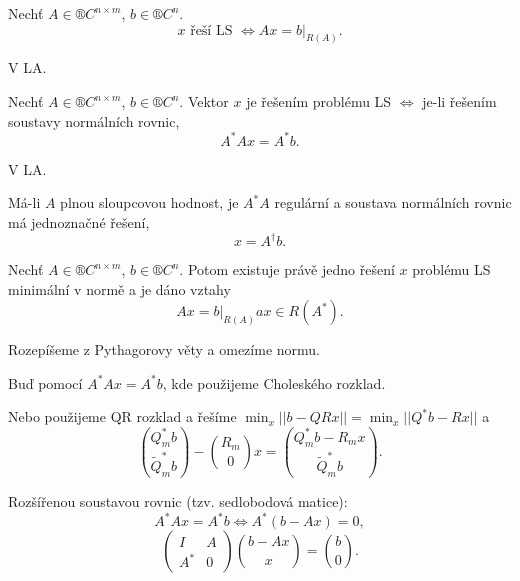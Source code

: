 \documentclass[12pt]{article}					%
\begin{document}
\begin{veta}[O řešení LS]
	Nechť $A \in ®C^{n \times m}$, $b \in ®C^n$.
	$$ x \text{ řeší LS } \Leftrightarrow Ax = b|_{R(A)}. $$

	\begin{dukazin}
		V LA.
	\end{dukazin}
\end{veta}

\begin{veta}
	Nechť $A \in ®C^{n \times m}$, $b \in ®C^n$. Vektor $x$ je řešením problému LS $\Leftrightarrow$ je-li řešením soustavy normálních rovnic,
	$$ A^*Ax = A^*b. $$

	\begin{dukazin}
		V LA.
	\end{dukazin}
\end{veta}

\begin{poznamka}
	Má-li $A$ plnou sloupcovou hodnost, je $A^*A$ regulární a soustava normálních rovnic má jednoznačné řešení,
	$$ x = A^\dagger b. $$
\end{poznamka}

\begin{veta}
	Nechť $A \in ®C^{n \times m}$, $b \in ®C^n$. Potom existuje právě jedno řešení $x$ problému LS minimální v normě a je dáno vztahy
	$$ Ax = b|_{R(A)} a x \in R(A^*). $$
	
	\begin{dukazin}
		Rozepíšeme z Pythagorovy věty a omezíme normu.
	\end{dukazin}
\end{veta}

\begin{poznamka}[Řešení LS]
	Buď pomocí $A^*Ax = A^*b$, kde použijeme Choleského rozklad.

	Nebo použijeme QR rozklad a řešíme $\min_x ||b - QRx|| = \min_x||Q^*b - Rx||$ a
	$$ \binom{Q^*_m b}{\tilde Q_m^*b} - \binom{R_m}{0}x = \binom{Q_m^* b - R_m x}{\tilde Q_m^* b}. $$

	Rozšířenou soustavou rovnic (tzv. sedlobodová matice):
	$$ A^*Ax = A^*b \Leftrightarrow A^*(b - Ax) = 0, $$
	$$ \begin{pmatrix} I & A \\ A^* & 0 \end{pmatrix} \binom{b - Ax}{x} = \binom{b}{0}. $$
\end{poznamka}
\end{document}
